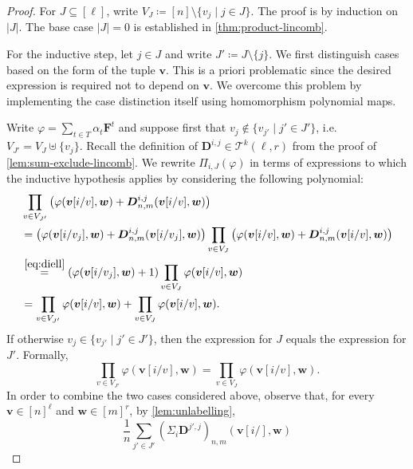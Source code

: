 \documentclass[11pt, DIV=15]{scrarticle}
\theoremstyle{definition}
\theoremstyle{plain}
\theoremstyle{remark}
\renewcommand{\phi}{\varphi}
\begin{document}
	\begin{proof}
		For $J \subseteq [\ell]$, write $V_J \coloneqq [n] \setminus \{v_j \mid j \in J\}$.
		The proof is by induction on $|J|$.
		The base case $|J| = 0$ is established in \cref{thm:product-lincomb}.
		
		For the inductive step, let $j \in J$ and write $J' \coloneqq J \setminus \{j\}$.
		We first distinguish cases based on the form of the tuple $\boldsymbol{v}$.
		This is a priori problematic since the desired expression is required not to depend on $\boldsymbol{v}$.
		We overcome this problem by implementing the case distinction itself using homomorphism polynomial maps.
		
		Write $\phi = \sum_{t \in T} \alpha_t \boldsymbol{F}^t$ and
		suppose first that $v_j \not\in \{v_{j'} \mid j' \in J'\}$, i.e.\ $V_{J'} = V_{J} \uplus \{v_j\}$.
		Recall the definition of $\boldsymbol{D}^{i,j} \in \mathcal{T}^k(\ell, r)$ from the proof of \cref{lem:sum-exclude-lincomb}.
		We rewrite $\Pi_{i, J} (\phi)$ in terms of expressions to which the inductive hypothesis applies by considering the following polynomial:
		\begin{align*}
			&\prod_{v \in V_{J'}}
			\left( \phi(\boldsymbol{v}[i/v], \boldsymbol{w}) + \boldsymbol{D}^{i, j}_{n, m}(\boldsymbol{v}[i/v], \boldsymbol{w}) \right)  \\
			&= \left( \phi(\boldsymbol{v}[i/v_j], \boldsymbol{w}) + \boldsymbol{D}^{i, j}_{n, m}(\boldsymbol{v}[i/v_j], \boldsymbol{w}) \right)  \prod_{v \in V_{J}}
			\left( \phi(\boldsymbol{v}[i/v], \boldsymbol{w}) + \boldsymbol{D}^{i, j}_{n, m}(\boldsymbol{v}[i/v], \boldsymbol{w}) \right) \\
			&\overset{\eqref{eq:diell}}{=} \left( \phi(\boldsymbol{v}[i/v_j], \boldsymbol{w}) + 1 \right) \prod_{v \in V_{J}} \phi(\boldsymbol{v}[i/v], \boldsymbol{w}) \\
			&= \prod_{v \in V_{J'}}  \phi(\boldsymbol{v}[i/v], \boldsymbol{w}) + \prod_{v \in V_{J}} \phi(\boldsymbol{v}[i/v], \boldsymbol{w}).
		\end{align*}
		If otherwise $v_j \in \{v_{j'} \mid j' \in J'\}$,
		then the expression for $J$ equals the expression for $J'$.
		Formally,
		\[
			\prod_{v \in V_{J'}}\phi(\boldsymbol{v}[i/v], \boldsymbol{w}) 
			= \prod_{v \in V_{J}}\phi(\boldsymbol{v}[i/v], \boldsymbol{w}). 
		\]
		In order to combine the two cases considered above,
		observe that, for every  $\boldsymbol{v} \in [n]^{\ell}$ and $\boldsymbol{w} \in [m]^r$, by \cref{lem:unlabelling},
		\[
			\frac1n \sum_{j' \in J'} (\Sigma_i\boldsymbol{D}^{j', j})_{n,m}(\boldsymbol{v}[i/], \boldsymbol{w}) 
\]
\end{proof}
\end{document}
